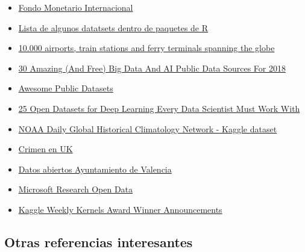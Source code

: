 \documentclass[]{article}
\begin{document}
\begin{itemize}
\item
  \href{http://www.imf.org/en/data}{Fondo Monetario Internacional}
\item
  \href{https://vincentarelbundock.github.io/Rdatasets/datasets.html}{Lista
  de algunos datatsets dentro de paquetes de R}
\item
  \href{https://openflights.org/data.html}{10.000 airports, train
  stations and ferry terminals spanning the globe}
\item
  \href{https://www.linkedin.com/pulse/30-amazing-free-big-data-ai-public-sources-2018-bernard-marr/?trackingId=nkTXcNLieYPDBqZuB3KIsw\%3D\%3D\&lipi=urn\%3Ali\%3Apage\%3Ad_flagship3_feed\%3B9KuSD9KfQ6ie\%2BALso3gwvw\%3D\%3D\&licu=urn\%3Ali\%3Acontrol\%3Ad_flagship3_feed-object}{30
  Amazing (And Free) Big Data And AI Public Data Sources For 2018}
\item
  \href{https://github.com/dipanjanS/awesome-public-datasets}{Awesome
  Public Datasets}
\item
  \href{https://www.analyticsvidhya.com/blog/2018/03/comprehensive-collection-deep-learning-datasets/}{25
  Open Datasets for Deep Learning Every Data Scientist Must Work With}
\item
  \href{https://www.kaggle.com/noaa/ghcn-d}{NOAA Daily Global Historical
  Climatology Network - Kaggle dataset}
\item
  \href{https://data.police.uk/}{Crimen en UK}
\item
  \href{http://gobiernoabierto.valencia.es/es/data/}{Datos abiertos
  Ayuntamiento de Valencia}
\item
  \href{https://msropendata.com/}{Microsoft Research Open Data}
\item
  \href{https://www.kaggle.com/general/37924\#post354114}{Kaggle Weekly
  Kernels Award Winner Announcements}
\end{itemize}

\subsection{Otras referencias
interesantes}\label{otras-referencias-interesantes}
\end{document}
